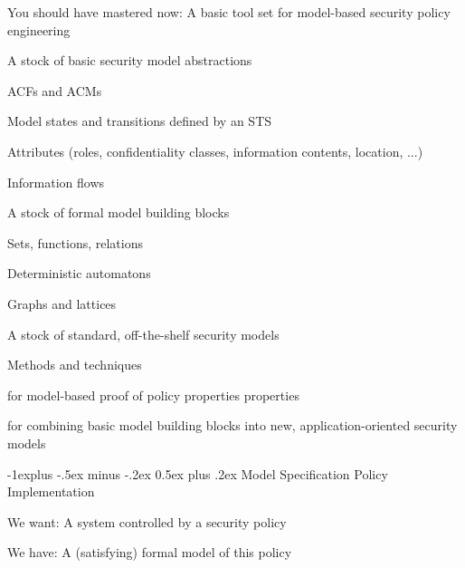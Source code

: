 \documentclass[a4paper]{article}
\makeatletter
\renewcommand{\subsection}{\@startsection{subsection}{2}{0mm}%
                                {-1explus -.5ex minus -.2ex}%
                                {0.5ex plus .2ex}%
                                {\normalfont\normalsize\bfseries}}
\makeatother
\begin{document}
\begin{multicols}{3}
    You should have mastered now: A basic tool set for model-based security policy engineering
    \begin{itemize*}
        \item A stock of basic security model abstractions
              \begin{itemize*}
                  \item ACFs and ACMs
                  \item Model states and transitions defined by an STS
                  \item Attributes (roles, confidentiality classes, information contents, location, ...)
                  \item Information flows
              \end{itemize*}
        \item A stock of formal model building blocks
              \begin{itemize*}
                  \item Sets, functions, relations
                  \item Deterministic automatons
                  \item Graphs and lattices
              \end{itemize*}
        \item A stock of standard, off-the-shelf security models
        \item Methods and techniques
              \begin{itemize*}
                  \item for model-based proof of policy properties properties
                  \item for combining basic model building blocks into new, application-oriented security models
              \end{itemize*}
    \end{itemize*}

    \subsection{Model Specification}
    Policy Implementation
    \begin{itemize*}
        \item We want: A system controlled by a security policy
        \item We have: A (satisfying) formal model of this policy
    \end{itemize*}


\end{multicols}
\end{document}
